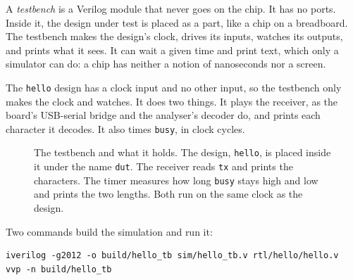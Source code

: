 \documentclass[11pt,a4paper]{article}
\begin{document}
A \emph{testbench} is a Verilog module that never goes on the chip. It has no ports. Inside it, the design under test is placed as a part, like a chip on a breadboard. The testbench makes the design’s clock, drives its inputs, watches its outputs, and prints what it sees. It can wait a given time and print text, which only a simulator can do: a chip has neither a notion of nanoseconds nor a screen.

The \texttt{hello} design has a clock input and no other input, so the testbench only makes the clock and watches. It does two things. It plays the receiver, as the board’s USB-serial bridge and the analyser’s decoder do, and prints each character it decodes. It also times \texttt{busy}, in clock cycles.

\begin{figure}[H]
  \centering
  \caption{The testbench and what it holds. The design, \texttt{hello}, is placed inside it under the name \texttt{dut}. The receiver reads \texttt{tx} and prints the characters. The timer measures how long \texttt{busy} stays high and low and prints the two lengths. Both run on the same clock as the design.}
\end{figure}

Two commands build the simulation and run it:

\begin{verbatim}
iverilog -g2012 -o build/hello_tb sim/hello_tb.v rtl/hello/hello.v
vvp -n build/hello_tb
\end{verbatim}
\end{document}
